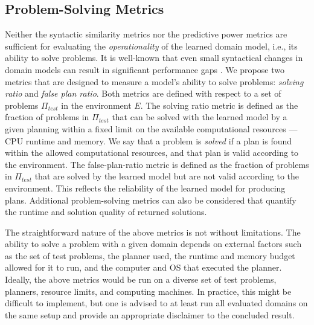 \documentclass[letterpaper]{article} %
\newcommand{\ptest}{\ensuremath{\Pi_{\textit{test}}}\xspace}
\newif\ifaddcomments
\newcommand{\roni}[1]{\ifaddcomments{\textcolor{red}{[Roni: #1]}}\fi}
\newcommand{\mauro}[1]{\ifaddcomments{\textcolor{green}{[Mauro: #1]}}\fi}
\newcommand{\gregor}[1]{\ifaddcomments{\textcolor{orange}{[Gregor: #1]}}\fi}
\begin{document}
\subsection{Problem-Solving Metrics}
Neither the syntactic similarity metrics nor the predictive power metrics are sufficient for evaluating the \emph{operationality} \citep{DBLP:conf/kcap/McCluskeyVV17} of the learned domain model, i.e., its ability to solve problems. It is well-known that even small syntactical changes in domain models can result in significant performance gaps \citep{DBLP:conf/kcap/VallatiC19,vallati2021importance}. 
We propose two metrics that are designed to measure a model's ability to solve problems: \emph{solving ratio} and \emph{false plan ratio}. 
Both metrics are defined with respect to a set of problems \ptest in the environment $E$. 
The solving ratio metric is defined as the fraction of problems in \ptest that can be solved with the learned model by a given planning within a fixed limit on the available computational resources --- CPU runtime and memory.
We say that a problem is \emph{solved} if a plan is found within the allowed computational resources, and that plan is valid according to the environment. 
The false-plan-ratio metric is defined as the fraction of problems in \ptest that are solved by the learned model but are not valid according to the environment. This reflects the reliability of the learned model for producing plans. 
Additional problem-solving metrics can also be considered that quantify the runtime and solution quality of returned solutions. 

The straightforward nature of the above metrics is not without limitations. The ability to solve a problem with a given domain depends on external factors such as the set of test problems, the planner used, the runtime and memory budget allowed for it to run, and the computer and OS that executed the planner. 
Ideally, the above metrics would be run on a diverse set of test problems, planners, resource limits, and computing machines. In practice, this might be difficult to implement, but one is advised to at least run all evaluated domains on the same setup and provide an appropriate disclaimer to the concluded result. 
\end{document}
